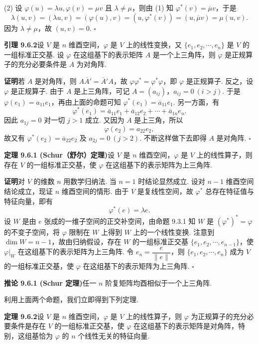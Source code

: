 \documentclass[UTF8,12pt,a4paper,fontset=fandol]{ctexart}
\begin{document}
(2) 设 $\varphi(u)=\lambda u,\varphi(v)=\mu v$ 且 $\lambda\ne\mu$，则由 (1) 知 $\varphi^*(v)=\overline\mu v$，于是
\[
  \lambda(u,v)=(\lambda u,v)=(\varphi(u),v)=(u,\varphi^*(v))=(u,\overline\mu v)=\mu(u,v).
\]
因为 $\lambda\ne\mu$，故 $(u,v)=0$. $\square$

\noindent\textbf{引理 9.6.2}\quad 设 $V$ 是 $n$ 维酉空间，$\varphi$ 是 $V$ 上的线性变换，又 $\{e_1,e_2,\cdots,e_n\}$ 是 $V$ 的一组标准正交基. 设 $\varphi$ 在这组基下的表示矩阵 $A$ 是一个上三角阵，则 $\varphi$ 是正规算子的充分必要条件是 $A$ 为对角阵.

\noindent\textbf{证明}\quad 若 $A$ 是对角阵，则 $A\overline A'=\overline A'A$，故 $\varphi\varphi^*=\varphi^*\varphi$，即 $\varphi$ 是正规算子. 反之，设 $\varphi$ 是正规算子. 由于 $A$ 是上三角阵，可记 $A=(a_{ij})$，$a_{ij}=0\ (i>j)$. 于是 $\varphi(e_1)=a_{11}e_1$，再由上面的命题可知 $\varphi^*(e_1)=\overline a_{11}e_1$. 另一方面，有
\[
  \varphi^*(e_1)=\overline a_{11}e_1+\overline a_{12}e_2+\cdots+\overline a_{1n}e_n.
\]
因此 $a_{1j}=0$ 对一切 $j>1$ 成立. 又因为 $A$ 是上三角，所以
\[
  \varphi(e_2)=a_{22}e_2,
\]
故又有 $\varphi^*(e_2)=\overline a_{22}e_2$ 及 $a_{2j}=0\ (j>2)$. 不断这样做下去即得 $A$ 是对角阵. $\square$

\noindent\textbf{定理 9.6.1 (Schur（舒尔）定理)}\quad 设 $V$ 是 $n$ 维酉空间，$\varphi$ 是 $V$ 上的线性算子，则存在 $V$ 的一组标准正交基，使 $\varphi$ 在这组基下的表示矩阵为上三角阵.

\noindent\textbf{证明}\quad 对 $V$ 的维数 $n$ 用数学归纳法. 当 $n=1$ 时结论显然成立. 设对 $n-1$ 维酉空间结论成立，现证 $n$ 维酉空间的情形. 由于 $V$ 是复线性空间，故 $\varphi^*$ 总存在特征值与特征向量，即有
\[
  \varphi^*(e)=\lambda e.
\]
设 $W$ 是由 $e$ 张成的一维子空间的正交补空间，由命题 9.3.1 知 $W$ 是 $(\varphi^*)^*=\varphi$ 的不变子空间，将 $\varphi$ 限制在 $W$ 上得到 $W$ 上的一个线性变换. 注意到 $\dim W=n-1$，故由归纳假设，存在 $W$ 的一组标准正交基 $\{e_1,e_2,\cdots,e_{n-1}\}$，使 $\varphi|_W$ 在这组基下的表示矩阵为上三角阵. 令 $e_n=\dfrac{e}{\|e\|}$，则 $\{e_1,e_2,\cdots,e_n\}$ 成为 $V$ 的一组标准正交基，使 $\varphi$ 在这组基下的表示矩阵为上三角阵. $\square$

\noindent\textbf{推论 9.6.1 (Schur 定理)}\quad 任一 $n$ 阶复矩阵均酉相似于一个上三角阵.

利用上面两个命题，我们立即得到下列定理.

\noindent\textbf{定理 9.6.2}\quad 设 $V$ 是 $n$ 维酉空间，$\varphi$ 是 $V$ 上的线性算子，则 $\varphi$ 为正规算子的充分必要条件是存在 $V$ 的一组标准正交基，使 $\varphi$ 在这组基下的表示矩阵是对角阵，特别，这组基恰为 $\varphi$ 的 $n$ 个线性无关的特征向量.
\end{document}
